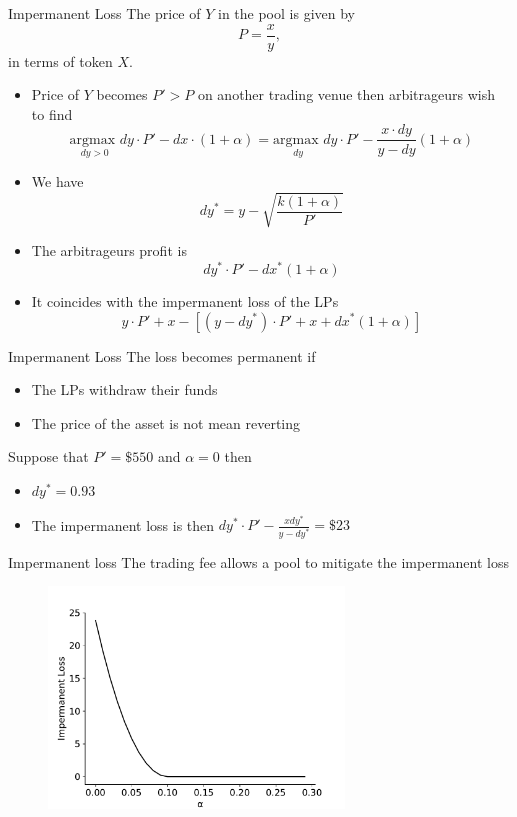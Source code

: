 \documentclass{beamer}
\begin{document}
\begin{frame}{Impermanent Loss}
\footnotesize
The price of $Y$ in the pool is given by 
$$
P = \frac{x}{y},
$$
in terms of token $X$.
\begin{itemize}
  \item Price of $Y$ becomes $P'>P$ on another trading venue then arbitrageurs wish to find
  $$
  \underset{dy > 0}{\text{argmax }}dy\cdot P' - dx\cdot (1+\alpha) =\underset{dy}{\text{argmax }}dy\cdot P' - \frac{x\cdot dy}{y-dy}(1+\alpha) 
  $$
  \item We have 
  $$
  dy^\ast = y - \sqrt{\frac{k(1+\alpha)}{P'}}
  $$
  \item The arbitrageurs profit is 
  $$
  dy^\ast\cdot P' -  dx^\ast (1+\alpha)
  $$
  \item It coincides with the impermanent loss of the LPs
  $$
  y\cdot P' + x - [(y-dy^\ast)\cdot P' + x + dx^\ast(1+\alpha)]
  $$
\end{itemize}
\end{frame}
\begin{frame}{Impermanent Loss}
The loss becomes permanent if 
\begin{itemize}
  \item The LPs withdraw their funds
  \item The price of the asset is not mean reverting
\end{itemize}
\begin{tcolorbox}[enhanced,drop shadow, title=Example]
    Suppose that $P' = \$550$ and $\alpha = 0$ then 
    \begin{itemize}
      \item $dy^\ast = 0.93$
      \item The impermanent loss is then $dy^\ast\cdot P' -\frac{xdy^\ast}{y - dy^\ast} = \$23$
    \end{itemize}
\end{tcolorbox}
\end{frame}

\begin{frame}{Impermanent loss}
\footnotesize
The trading fee allows a pool to mitigate the impermanent loss
\begin{figure}[!ht]
    \includegraphics[width = 0.7\textwidth]{../../Figures/imp_loss.pdf}
    \centering
    \label{fig:imp_loss}
\end{figure}
\end{frame}
\end{document}
